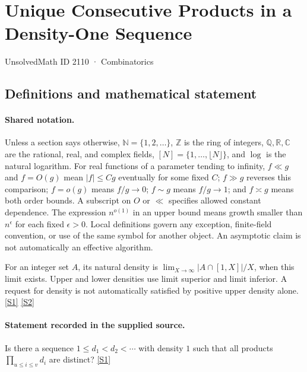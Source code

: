 \documentclass[11pt,a4paper]{article}
\newcommand{\N}{\mathbb{N}}
\newcommand{\Z}{\mathbb{Z}}
\newcommand{\Q}{\mathbb{Q}}
\newcommand{\R}{\mathbb{R}}
\newcommand{\C}{\mathbb{C}}
\newcommand{\sref}[2]{\hyperlink{source:#1:#2}{[S#2]}}
\begin{document}

\setcounter{section}{2109}

\section{Unique Consecutive Products in a Density-One Sequence}\label{2110}

{\small\sffamily UnsolvedMath ID 2110 · Combinatorics}

\subsection{Definitions and mathematical statement}

\paragraph{Shared notation.}Unless a section says otherwise, $\N=\{1,2,\ldots\}$,
$\Z$ is the ring of integers, $\Q,\R,\C$ are the rational, real, and complex
fields, $[N]=\{1,\ldots,\lfloor N\rfloor\}$, and $\log$ is the natural
logarithm. For real functions of a parameter tending to infinity,
$f\ll g$ and $f=O(g)$ mean $|f|\leq Cg$ eventually for some fixed $C$;
$f\gg g$ reverses this comparison; $f=o(g)$ means $f/g\to0$;
$f\sim g$ means $f/g\to1$; and $f\asymp g$ means both order bounds.
A subscript on $O$ or $\ll$ specifies allowed constant dependence.
The expression $n^{o(1)}$ in an upper bound means growth smaller than
$n^\epsilon$ for each fixed $\epsilon>0$. Local definitions govern any
exception, finite-field convention, or use of the same symbol for another
object. An asymptotic claim is not automatically an effective algorithm.



For an integer set $A$, its natural density is $\lim_{X\to\infty}|A\cap[1,X]|/X$, when this limit exists. Upper and lower densities use limit superior and limit inferior. A request for density is not automatically satisfied by positive upper density alone. \sref{2110}{1} \sref{2110}{2}

\paragraph{Statement recorded in the supplied source.}
Is there a sequence $1\leq d_1<d_2<\cdots$ with density $1$ such that all products $\prod_{u\leq i\leq v}d_i$ are distinct? \sref{2110}{1}
\end{document}
